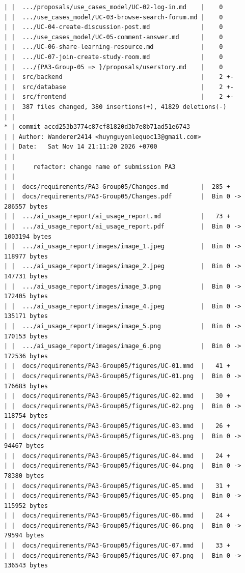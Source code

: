\documentclass[12pt]{article}
\begin{document}
\begin{lstlisting}[numbers=none,breaklines=true]
| |  .../proposals/use_cases_model/UC-02-log-in.md    |    0
| |  .../use_cases_model/UC-03-browse-search-forum.md |    0
| |  .../UC-04-create-discussion-post.md              |    0
| |  .../use_cases_model/UC-05-comment-answer.md      |    0
| |  .../UC-06-share-learning-resource.md             |    0
| |  .../UC-07-join-create-study-room.md              |    0
| |  .../{PA3-Group-05 => }/proposals/userstory.md    |    0
| |  src/backend                                      |    2 +-
| |  src/database                                     |    2 +-
| |  src/frontend                                     |    2 +-
| |  387 files changed, 380 insertions(+), 41829 deletions(-)
| |
* | commit accd253b3774c87cf81820d3b7e8b71ad51e6743
| | Author: Wanderer2414 <huynguyenlequoc13@gmail.com>
| | Date:   Sat Nov 14 21:11:20 2026 +0700
| |
| |     refactor: change name of submission PA3
| |
| |  docs/requirements/PA3-Group05/Changes.md         |  285 +
| |  docs/requirements/PA3-Group05/Changes.pdf        |  Bin 0 -> 286557 bytes
| |  .../ai_usage_report/ai_usage_report.md           |   73 +
| |  .../ai_usage_report/ai_usage_report.pdf          |  Bin 0 -> 1003194 bytes
| |  .../ai_usage_report/images/image_1.jpeg          |  Bin 0 -> 118977 bytes
| |  .../ai_usage_report/images/image_2.jpeg          |  Bin 0 -> 147731 bytes
| |  .../ai_usage_report/images/image_3.png           |  Bin 0 -> 172405 bytes
| |  .../ai_usage_report/images/image_4.jpeg          |  Bin 0 -> 135171 bytes
| |  .../ai_usage_report/images/image_5.png           |  Bin 0 -> 170153 bytes
| |  .../ai_usage_report/images/image_6.png           |  Bin 0 -> 172536 bytes
| |  docs/requirements/PA3-Group05/figures/UC-01.mmd  |   41 +
| |  docs/requirements/PA3-Group05/figures/UC-01.png  |  Bin 0 -> 176683 bytes
| |  docs/requirements/PA3-Group05/figures/UC-02.mmd  |   30 +
| |  docs/requirements/PA3-Group05/figures/UC-02.png  |  Bin 0 -> 118754 bytes
| |  docs/requirements/PA3-Group05/figures/UC-03.mmd  |   26 +
| |  docs/requirements/PA3-Group05/figures/UC-03.png  |  Bin 0 -> 94467 bytes
| |  docs/requirements/PA3-Group05/figures/UC-04.mmd  |   24 +
| |  docs/requirements/PA3-Group05/figures/UC-04.png  |  Bin 0 -> 78380 bytes
| |  docs/requirements/PA3-Group05/figures/UC-05.mmd  |   31 +
| |  docs/requirements/PA3-Group05/figures/UC-05.png  |  Bin 0 -> 115952 bytes
| |  docs/requirements/PA3-Group05/figures/UC-06.mmd  |   24 +
| |  docs/requirements/PA3-Group05/figures/UC-06.png  |  Bin 0 -> 79594 bytes
| |  docs/requirements/PA3-Group05/figures/UC-07.mmd  |   33 +
| |  docs/requirements/PA3-Group05/figures/UC-07.png  |  Bin 0 -> 136543 bytes

\end{lstlisting}
\end{document}
